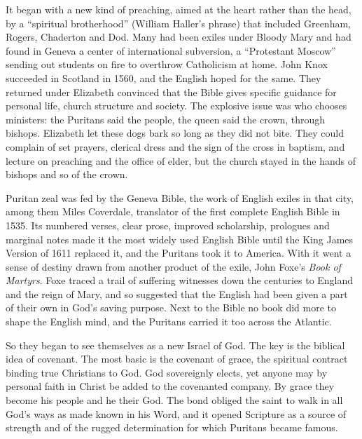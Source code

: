 It began with a new kind of preaching, aimed at the heart rather than the head, by a ``spiritual
brotherhood'' (William Haller's phrase) that included Greenham, Rogers, Chaderton and Dod. Many had
been exiles under Bloody Mary and had found in Geneva a center of international subversion, a
``Protestant Moscow'' sending out students on fire to overthrow Catholicism at home. John Knox
succeeded in Scotland in 1560, and the English hoped for the same. They returned under Elizabeth
convinced that the Bible gives specific guidance for personal life, church structure and society. The
explosive issue was who chooses ministers: the Puritans said the people, the queen said the crown,
through bishops. Elizabeth let these dogs bark so long as they did not bite. They could complain of
set prayers, clerical dress and the sign of the cross in baptism, and lecture on preaching and the
office of elder, but the church stayed in the hands of bishops and so of the crown.

Puritan zeal was fed by the Geneva Bible, the work of English exiles in that city, among them Miles
Coverdale, translator of the first complete English Bible in 1535. Its numbered verses, clear prose,
improved scholarship, prologues and marginal notes made it the most widely used English Bible until
the King James Version of 1611 replaced it, and the Puritans took it to America. With it went a sense
of destiny drawn from another product of the exile, John Foxe's \emph{Book of Martyrs}. Foxe traced a
trail of suffering witnesses down the centuries to England and the reign of Mary, and so suggested that the English had been given a part of their own in God's saving purpose. Next to
the Bible no book did more to shape the English mind, and the Puritans carried it too across the
Atlantic.

So they began to see themselves as a new Israel of God. The key is the biblical idea of covenant.
The most basic is the covenant of grace, the spiritual contract binding true Christians to God. God
sovereignly elects, yet anyone may by personal faith in Christ be added to the covenanted company. By
grace they become his people and he their God. The bond obliged the saint to walk in all God's ways
as made known in his Word, and it opened Scripture as a source of strength and of the rugged
determination for which Puritans became famous.

